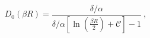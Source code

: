 \begin{equation}
D_0(\beta R)=\frac{\delta/\alpha}{\delta/\alpha\left[\ln\left(\frac{\beta R}2
\right)+{\mathcal{C}}\right]-1} \ ,
\label{37}
\end{equation}

